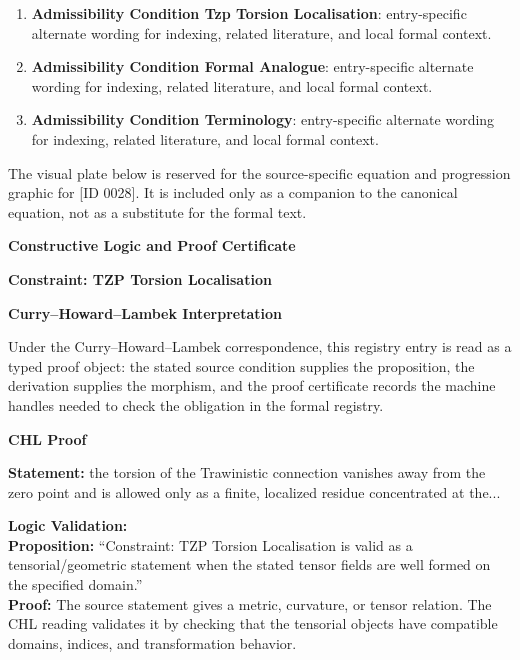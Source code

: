 \begingroup\footnotesize\sloppy
\begin{enumerate}[leftmargin=1.35em,itemsep=1pt,topsep=1pt,parsep=0pt]
\item \textbf{Admissibility Condition Tzp Torsion Localisation}: entry-specific alternate wording for indexing, related literature, and local formal context.
\item \textbf{Admissibility Condition Formal Analogue}: entry-specific alternate wording for indexing, related literature, and local formal context.
\item \textbf{Admissibility Condition Terminology}: entry-specific alternate wording for indexing, related literature, and local formal context.
\end{enumerate}
\endgroup

\begingroup\footnotesize\sloppy
The visual plate below is reserved for the source-specific equation and progression graphic for [ID 0028]. It is included only as a companion to the canonical equation, not as a substitute for the formal text.
\par\endgroup
\ifTZPDarkEdition
{}
\fi

\clearpage
\begingroup\tzpsupportsetup
\noindent\textbf{\fontsize{10.8pt}{12.8pt}\selectfont [ID 0028] Constructive Logic and Proof Certificate}\par
\noindent\textbf{\fontsize{10pt}{12pt}\selectfont Constraint: TZP Torsion Localisation}\par
\vspace{0.45em}
\begingroup
\footnotesize
\setlength{\parskip}{0.22em}
\setlength{\parindent}{0pt}
\noindent\textbf{Curry--Howard--Lambek Interpretation}\par
Under the Curry--Howard--Lambek correspondence, this registry entry is read as a typed proof
object: the stated source condition supplies the proposition, the derivation supplies the
morphism, and the proof certificate records the machine handles needed to check the obligation
in the formal registry.

\vspace{0.45em}
\noindent\textbf{CHL Proof}\par
\textbf{Statement:} the torsion of the Trawinistic connection vanishes away from the zero point and is
allowed only as a finite, localized residue concentrated at the...

\textbf{Logic Validation:}\\
\textbf{Proposition:} ``Constraint: TZP Torsion Localisation is valid as a tensorial/geometric statement when
the stated tensor fields are well formed on the specified domain.''\\
\textbf{Proof:} The source statement gives a metric, curvature, or tensor relation. The CHL reading
validates it by checking that the tensorial objects have compatible domains, indices,
and transformation behavior.

